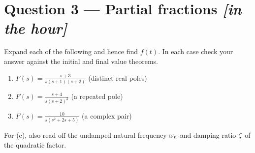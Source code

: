 \documentclass[11pt,a4paper]{article}
\newcommand{\inhour}{\hfill{\small\color{faccent}\itshape[in the hour]}}
\begin{document}
\section*{Question 3 --- Partial fractions \inhour}

Expand each of the following and hence find $f(t)$. In each case check your
answer against the initial and final value theorems.

\begin{enumerate}[label=(\alph*)]
\item $\displaystyle F(s)=\frac{s+3}{s(s+1)(s+2)}$ \hfill (distinct real poles)
\item $\displaystyle F(s)=\frac{s+4}{s(s+2)^{2}}$ \hfill (a repeated pole)
\item $\displaystyle F(s)=\frac{10}{s(s^{2}+2s+5)}$ \hfill (a complex pair)
\end{enumerate}

For (c), also read off the undamped natural frequency $\omega_{n}$ and damping ratio
$\zeta$ of the quadratic factor.
\end{document}
